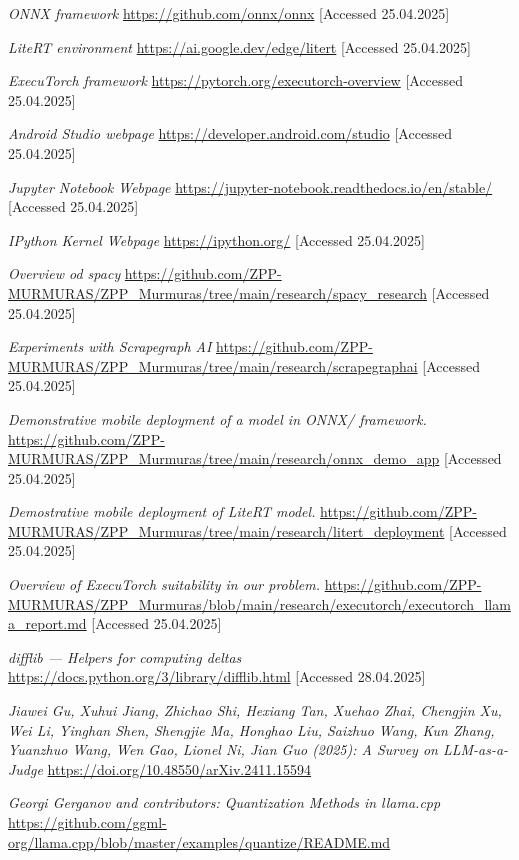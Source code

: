 \documentclass[licencjacka,en]{pracamgr}
\begin{document}
\begin{thebibliography}{99}
\textit{ONNX framework}
\url{https://github.com/onnx/onnx}
[Accessed 25.04.2025]

\textit{LiteRT environment}
\url{https://ai.google.dev/edge/litert}
[Accessed 25.04.2025]

\textit{ExecuTorch framework}
\url{https://pytorch.org/executorch-overview}
[Accessed 25.04.2025]

\textit{Android Studio webpage}
\url{https://developer.android.com/studio}
[Accessed 25.04.2025]

\textit{Jupyter Notebook Webpage}
\url{https://jupyter-notebook.readthedocs.io/en/stable/}
[Accessed 25.04.2025]

\textit{IPython Kernel Webpage}
\url{https://ipython.org/}
[Accessed 25.04.2025]

\textit{Overview od spacy}
\url{https://github.com/ZPP-MURMURAS/ZPP_Murmuras/tree/main/research/spacy_research}
[Accessed 25.04.2025]

\textit{Experiments with Scrapegraph AI}
\url{https://github.com/ZPP-MURMURAS/ZPP_Murmuras/tree/main/research/scrapegraphai}
[Accessed 25.04.2025]

\textit{Demonstrative mobile deployment of a model in ONNX/ framework.}
\url{https://github.com/ZPP-MURMURAS/ZPP_Murmuras/tree/main/research/onnx_demo_app}
[Accessed 25.04.2025]

\textit{Demostrative mobile deployment of LiteRT model.}
\url{https://github.com/ZPP-MURMURAS/ZPP_Murmuras/tree/main/research/litert_deployment}
[Accessed 25.04.2025]

\textit{Overview of ExecuTorch suitability in our problem.}
\url{https://github.com/ZPP-MURMURAS/ZPP_Murmuras/blob/main/research/executorch/executorch_llama_report.md}
[Accessed 25.04.2025]

\textit{difflib --- Helpers for computing deltas}
\url{https://docs.python.org/3/library/difflib.html}
[Accessed 28.04.2025]

\textit{Jiawei Gu, Xuhui Jiang, Zhichao Shi, Hexiang Tan, Xuehao Zhai, Chengjin Xu, Wei Li, Yinghan Shen, Shengjie Ma, Honghao Liu, Saizhuo Wang, Kun Zhang, Yuanzhuo Wang, Wen Gao, Lionel Ni, Jian Guo (2025): A Survey on LLM-as-a-Judge}
\url{https://doi.org/10.48550/arXiv.2411.15594}

\textit{Georgi Gerganov and contributors: Quantization Methods in llama.cpp}
\url{https://github.com/ggml-org/llama.cpp/blob/master/examples/quantize/README.md}

\end{thebibliography}
\end{document}
